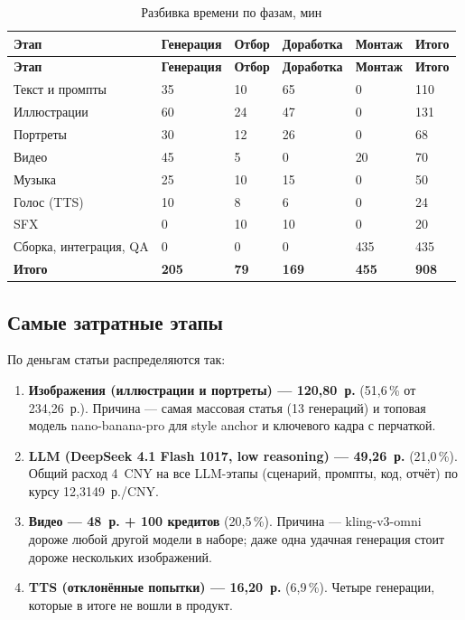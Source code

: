 \documentclass[12pt, a4paper]{article}
\begin{document}
\begin{scriptsize}
\setlength{\tabcolsep}{4pt}
\begin{longtable}{@{}L{4.4cm}L{1.9cm}L{1.6cm}L{2cm}L{2.4cm}L{1.6cm}@{}}
\caption{Разбивка времени по фазам, мин}\label{tab:time}\\
\toprule
\textbf{Этап} & \textbf{Генерация} & \textbf{Отбор} & \textbf{Доработка} & \textbf{Монтаж} & \textbf{Итого} \\
\midrule
\endfirsthead
\toprule
\textbf{Этап} & \textbf{Генерация} & \textbf{Отбор} & \textbf{Доработка} & \textbf{Монтаж} & \textbf{Итого} \\
\midrule
\endhead
\bottomrule
\endlastfoot
Текст и промпты & 35 & 10 & 65 & 0 & 110 \\
Иллюстрации & 60 & 24 & 47 & 0 & 131 \\
Портреты & 30 & 12 & 26 & 0 & 68 \\
Видео & 45 & 5 & 0 & 20 & 70 \\
Музыка & 25 & 10 & 15 & 0 & 50 \\
Голос (TTS) & 10 & 8 & 6 & 0 & 24 \\
SFX & 0 & 10 & 10 & 0 & 20 \\
Сборка, интеграция, QA & 0 & 0 & 0 & 435 & 435 \\
\addlinespace
\textbf{Итого} & \textbf{205} & \textbf{79} & \textbf{169} & \textbf{455} & \textbf{908} \\
\end{longtable}
\end{scriptsize}

\subsection{Самые затратные этапы}
По деньгам статьи распределяются так:

\begin{enumerate}
\setlength{\itemsep}{2pt}
    \item \textbf{Изображения (иллюстрации и портреты) --- 120{,}80~р.} (51{,}6\,\% от 234{,}26~р.). Причина --- самая массовая статья (13 генераций) и топовая модель nano-banana-pro для style anchor и ключевого кадра с перчаткой.
    \item \textbf{LLM (DeepSeek 4.1 Flash 1017, low reasoning) --- 49{,}26~р.} (21{,}0\,\%). Общий расход 4~CNY на все LLM-этапы (сценарий, промпты, код, отчёт) по курсу 12{,}3149~р./CNY.
    \item \textbf{Видео --- 48~р. + 100 кредитов} (20{,}5\,\%). Причина --- kling-v3-omni дороже любой другой модели в наборе; даже одна удачная генерация стоит дороже нескольких изображений.
    \item \textbf{TTS (отклонённые попытки) --- 16{,}20~р.} (6{,}9\,\%). Четыре генерации, которые в итоге не вошли в продукт.
\end{enumerate}
\end{document}
